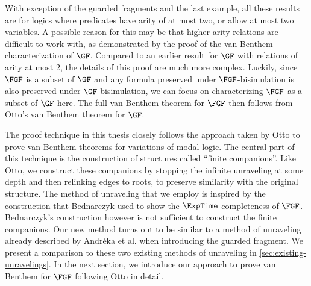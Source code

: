 With exception of the guarded fragments and the last example, all these results are for logics where predicates have arity of at most two, or allow at most two variables.
A possible reason for this may be that higher-arity relations are difficult to work with, as demonstrated by the proof of the van Benthem characterization of $\GF$\cite{Otto2012}.
Compared to an earlier result for $\GF$ with relations of arity at most 2\cite{Otto04}, the details of this proof are much more complex.
Luckily, since $\FGF$ is a subset of $\GF$ and any formula preserved under $\FGF$-bisimulation is also preserved under $\GF$-bisimulation, we can focus on characterizing $\FGF$ as a subset of $\GF$ here.
The full van Benthem theorem for $\FGF$ then follows from Otto's van Benthem theorem for $\GF$.

The proof technique in this thesis closely follows the approach taken by Otto to prove van Benthem theorems for variations of modal logic\cite{Otto04, otto2004a}.
The central part of this technique is the construction of structures called ``finite companions''.
Like Otto, we construct these companions by stopping the infinite unraveling at some depth and then relinking edges to roots, to preserve similarity with the original structure.
The method of unraveling that we employ is inspired by the construction that Bednarczyk used to show the $\ExpTime$-completeness of $\FGF$\cite{Bednarczyk21}.
Bednarczyk's construction however is not sufficient to construct the finite companions.
Our new method turns out to be similar to a method of unraveling already described by Andréka et al. when introducing the guarded fragment\cite{AndrekaNB98}.
We present a comparison to these two existing methods of unraveling in \cref{sec:existing-unravelings}.
In the next section, we introduce our approach to prove van Benthem for $\FGF$ following Otto in detail.

